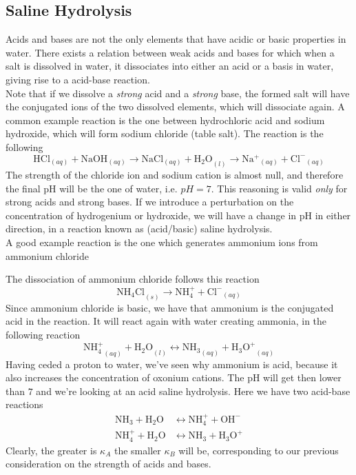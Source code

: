 \documentclass[../qm.tex]{subfiles}
\begin{document}
\subsection{Saline Hydrolysis}
Acids and bases are not the only elements that have acidic or basic properties in water. There exists a relation between weak acids and bases for which when a salt is dissolved in water, it dissociates into either an acid or a basis in water, giving rise to a acid-base reaction.\\
Note that if we dissolve a \textit{strong} acid and a \textit{strong} base, the formed salt will have the conjugated ions of the two dissolved elements, which will dissociate again. A common example reaction is the one between hydrochloric acid and sodium hydroxide, which will form sodium chloride (table salt). The reaction is the following
\begin{equation}
	\mathrm{HCl}_{(aq)}+\mathrm{NaOH}_{(aq)}\to\mathrm{NaCl}_{(aq)}+\mathrm{H_2O}_{(l)}\to\mathrm{Na^+}_{(aq)}+\mathrm{Cl^-}_{(aq)}
	\label{eq:tablesalt.chem}
\end{equation}
The strength of the chloride ion and sodium cation is almost null, and therefore the final pH will be the one of water, i.e. $pH=7$. This reasoning is valid \textit{only} for strong acids and strong bases. If we introduce a perturbation on the concentration of hydrogenium or hydroxide, we will have a change in pH in either direction, in a reaction known as (acid/basic) saline hydrolysis.\\
A good example reaction is the one which generates ammonium ions from ammonium chloride
\begin{eg}
	The dissociation of ammonium chloride follows this reaction
	\begin{equation*}
		\mathrm{NH_4Cl}_{(s)}\to\mathrm{NH_4^+}+\mathrm{Cl^-}_{(aq)}
	\end{equation*}
	Since ammonium chloride is basic, we have that ammonium is the conjugated acid in the reaction. It will react again with water creating ammonia, in the following reaction
	\begin{equation*}
		\mathrm{NH_4^+}_{(aq)}+\mathrm{H_2O}_{(l)}\longleftrightarrow\mathrm{NH_3}_{(aq)}+\mathrm{H_3O^+}_{(aq)}
	\end{equation*}
	Having ceded a proton to water, we've seen why ammonium is acid, because it also increases the concentration of oxonium cations. The pH will get then lower than $7$ and we're looking at an acid saline hydrolysis. Here we have two acid-base reactions
	\begin{equation*}
		\begin{aligned}
			\mathrm{NH_3}+\mathrm{H_2O}&\longleftrightarrow\mathrm{NH_4^+}+\mathrm{OH^-}\\
			\mathrm{NH_4^+}+\mathrm{H_2O}&\longleftrightarrow\mathrm{NH_3}+\mathrm{H_3O^+}
		\end{aligned}
	\end{equation*}
	Clearly, the greater is $\kappa_A$ the smaller $\kappa_B$ will be, corresponding to our previous consideration on the strength of acids and bases.\\
\end{eg}
\end{document}
